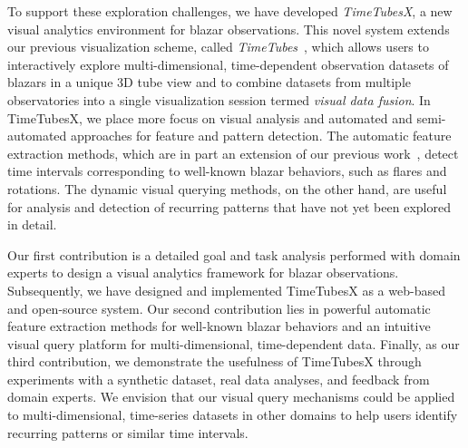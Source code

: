 To support these exploration challenges, 
we have developed \textit{TimeTubesX}, a new visual analytics environment for blazar observations. 
This novel system extends our previous visualization scheme, called \textit{TimeTubes}~\cite{Fujishiro2018}, 
which allows users to interactively explore multi-dimensional, time-dependent observation datasets of blazars in a unique 3D tube view and to combine datasets from multiple observatories into a single visualization session termed \emph{visual data fusion}.
In TimeTubesX, we place more focus on visual analysis and automated and semi-automated approaches for feature and pattern detection.
The automatic feature extraction methods, which are in part an extension of our previous work~\cite{Sawada2018}, detect time intervals corresponding to well-known blazar behaviors, such as flares and rotations.
The dynamic visual querying methods, on the other hand, are useful for analysis and detection of recurring patterns that have not yet been explored in detail. 

Our first contribution is a detailed goal and task analysis performed with domain experts to design a visual analytics framework for blazar observations. 
Subsequently, we have designed and implemented TimeTubesX as a web-based and open-source system. 
Our second contribution lies in powerful automatic feature extraction methods for well-known blazar behaviors and an intuitive visual query platform for multi-dimensional, time-dependent data.
Finally, as our third contribution, we demonstrate the usefulness of TimeTubesX through experiments with a synthetic dataset, real data analyses, and feedback from domain experts.
We envision that our visual query mechanisms could be applied to multi-dimensional, time-series datasets in other domains to help users identify recurring patterns or similar time intervals.